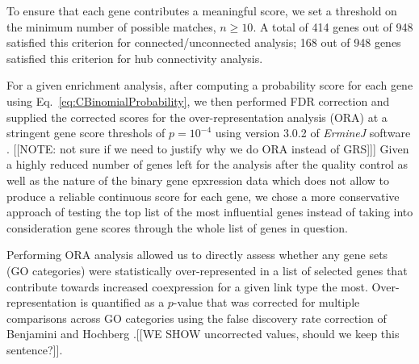 \documentclass[10pt,letterpaper]{article}
\begin{document}
To ensure that each gene contributes a meaningful score, we set a threshold on the minimum number of possible matches, $n \geq 10$.
A total of 414 genes out of 948 satisfied this criterion for connected/unconnected analysis; 168 out of 948 genes satisfied this criterion for hub connectivity analysis.

For a given enrichment analysis, after computing a probability score for each gene using Eq.~\eqref{eq:CBinomialProbability}, we then performed FDR correction and supplied the corrected scores for the over-representation analysis (ORA) at a stringent gene score threshols of $p=10^{-4}$ using version 3.0.2 of \emph{ErmineJ} software \cite{Gillis2010}.
[[NOTE: not sure if we need to justify why we do ORA instead of GRS]]]
Given a highly reduced number of genes left for the analysis after the quality control as well as the nature of the binary gene epxression data which does not allow to produce a reliable continuous score for each gene, we chose a more conservative approach of testing the top list of the most influential genes instead of taking into consideration gene scores through the whole list of genes in question. 

Performing ORA analysis allowed us to directly assess whether any gene sets (GO categories) were statistically over-represented in a list of selected genes that contribute towards increased coexpression for a given link type the most. Over-representation is quantified as a $p$-value that was corrected for multiple comparisons across GO categories using the false discovery rate correction of Benjamini and Hochberg \cite{Benjamini:1995cd}.[[WE SHOW uncorrected values, should we keep this sentence?]]. 
\end{document}
